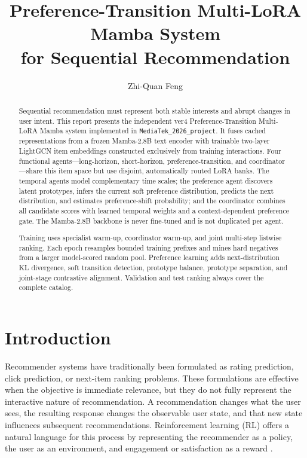 \documentclass[11pt,a4paper]{article}
\title{\textbf{Preference-Transition Multi-LoRA Mamba System\\for Sequential Recommendation}}
\author{Zhi-Quan Feng}
\date{}
\newcommand{\Project}{\texttt{MediaTek\_2026\_project}}
\begin{document}
\maketitle

\begin{abstract}
Sequential recommendation must represent both stable interests and abrupt changes in user intent. This report presents the independent ver4 Preference-Transition Multi-LoRA Mamba system implemented in \Project. It fuses cached representations from a frozen Mamba-2.8B text encoder with trainable two-layer LightGCN item embeddings constructed exclusively from training interactions. Four functional agents---long-horizon, short-horizon, preference-transition, and coordinator---share this item space but use disjoint, automatically routed LoRA banks. The temporal agents model complementary time scales; the preference agent discovers latent prototypes, infers the current soft preference distribution, predicts the next distribution, and estimates preference-shift probability; and the coordinator combines all candidate scores with learned temporal weights and a context-dependent preference gate. The Mamba-2.8B backbone is never fine-tuned and is not duplicated per agent.

Training uses specialist warm-up, coordinator warm-up, and joint multi-step
listwise ranking. Each epoch resamples bounded training prefixes and mines hard
negatives from a larger model-scored random pool. Preference learning adds
next-distribution KL divergence, soft transition detection, prototype balance,
prototype separation, and joint-stage contrastive alignment. Validation and
test ranking always cover the complete catalog.
\end{abstract}

\section{Introduction}

Recommender systems have traditionally been formulated as rating prediction, click prediction, or next-item ranking problems. These formulations are effective when the objective is immediate relevance, but they do not fully represent the interactive nature of recommendation. A recommendation changes what the user sees, the resulting response changes the observable user state, and that new state influences subsequent recommendations. Reinforcement learning (RL) offers a natural language for this process by representing the recommender as a policy, the user as an environment, and engagement or satisfaction as a reward \cite{RLSURVEY}.
\end{document}
